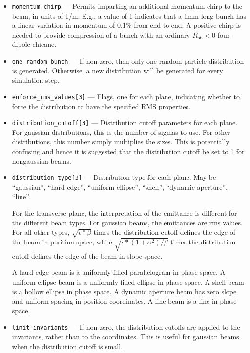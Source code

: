 \documentclass[11pt]{article}
\begin{document}
\begin{itemize}
\item \verb|momentum_chirp| --- Permits imparting an additional
momentum chirp to the beam, in units of 1/m.  E.g., a value of 1
indicates that a 1mm long bunch has a linear variation in momentum of
0.1\% from end-to-end.  A positive chirp is needed to provide
compression of a bunch with an ordinary $R_{56}<0$ four-dipole
chicane.

\item \verb|one_random_bunch| --- If non-zero, then only one random particle distribution is generated.  Otherwise,
a new distribution will be generated for every simulation step.
\item \verb|enforce_rms_values[3]| --- Flags, one for each plane, indicating whether to force the distribution to have the 
specified RMS properties.

\item \verb|distribution_cutoff[3]| --- Distribution cutoff parameters
for each plane.  For gaussian distributions, this is the number of
sigmas to use.  For other distributions, this number simply multiplies
the sizes.  This is potentially confusing and hence it is suggested
that the distribution cutoff be set to 1 for nongaussian beams.

\item \verb|distribution_type[3]| --- Distribution type for each
plane.  May be ``gaussian'', ``hard-edge'', ``uniform-ellipse'',
``shell'', ``dynamic-aperture'', ``line''.

For the transverse plane, the interpretation of the emittance is
different for the different beam types.  For gaussian beams, the
emittances are rms values.  For all other types, $\sqrt{\epsilon*\beta}$
times the distribution cutoff defines the edge of the beam in position
space, while $\sqrt{\epsilon*(1+\alpha^2)/\beta}$ times the distribution
cutoff defines the edge of the beam in slope space.  

A hard-edge beam is a uniformly-filled parallelogram in phase space.
A uniform-ellipse beam is a uniformly-filled ellipse in phase space.
A shell beam is a hollow ellipse in phase space.  A dynamic aperture
beam has zero slope and uniform spacing in position coordinates.  A
line beam is a line in phase space.

\item \verb|limit_invariants| --- If non-zero, the distribution
cutoffs are applied to the invariants, rather than to the coordinates.
This is useful for gaussian beams when the distribution cutoff is
small.


\end{itemize}
\end{document}
